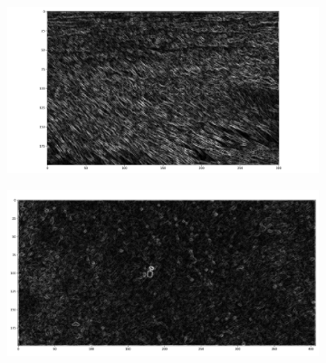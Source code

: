 \documentclass[
  letterpaper,
  DIV=11,
  numbers=noendperiod]{scrreprt}
\begin{document}
\begin{figure}

\begin{minipage}{0.33\linewidth}

\begin{figure}[H]

{\centering \includegraphics{images/plots/grass/internet_grass_mag.png}

}


\end{figure}%

\end{minipage}%
%
\begin{minipage}{0.33\linewidth}

\begin{figure}[H]

{\centering \includegraphics{images/plots/grass/aerial_living_lab_grass_mag.png}

}


\end{figure}%


\end{minipage}
\end{figure}
\end{document}
